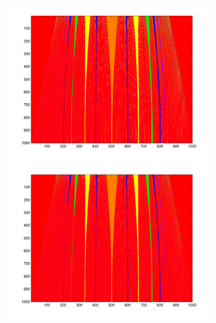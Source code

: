 \begin{figure}[htp]
\includegraphics[width=.5\textwidth]{figs/tongues_1000_L_07.png}\hfill
\includegraphics[width=.5\textwidth]{figs/tongues_1000_L_09.png}\\
\end{figure}

